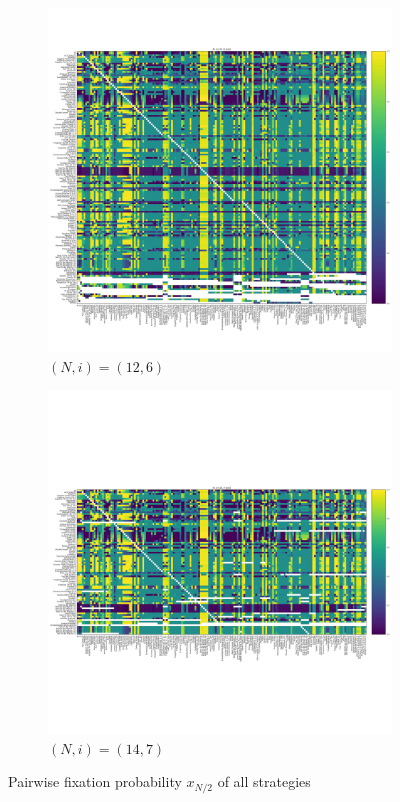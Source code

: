 \documentclass{article}
\begin{document}
\begin{figure}[!hbtp]
\begin{subfigure}[t]{.3\textwidth}
        \centering
        \includegraphics[width=.8\textwidth]{../img/fixation_heatmap_12_6_std.pdf}
        \caption{\((N,i)=(12, 6)\)}
    \end{subfigure}%

    \begin{subfigure}[t]{.3\textwidth}
        \centering
        \includegraphics[width=.8\textwidth]{../img/fixation_heatmap_14_7_std.pdf}
        \caption{\((N,i)=(14, 7)\)}
    \end{subfigure}%
    \caption{Pairwise fixation probability \(x_{N/2}\) of all strategies}
    \label{fig:fixation_heatmap_n_over_2_std}
\end{figure}
\end{document}
